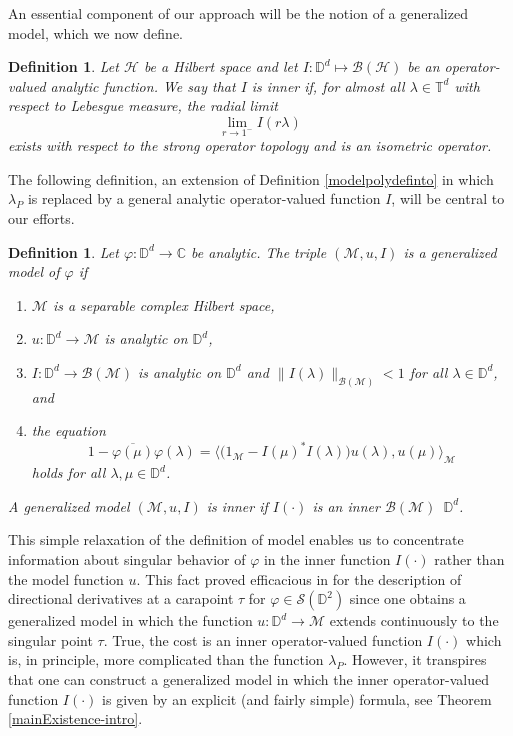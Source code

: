 \documentclass[11pt, reqno]{amsart}
\newtheorem{definition}[theorem]{Definition}
\newcommand\1{\boldsymbol {1}}
\newcommand\m{\mathcal{M}}
\newcommand\lam{\lambda}
\newcommand{\M}{\mathcal{M}}
\newcommand{\D}{\mathbb{D}}
\newcommand{\C}{\mathbb{C}}
\newcommand{\vp}{\varphi}
\newcommand{\ph}{\varphi}
\numberwithin{equation}{section}
\begin{document}
  An essential component of our approach will be the notion of a generalized model, which we now define. 
\begin{definition}\label{inneroperator}
Let $\mathcal{H}$ be a Hilbert space and let 
$I : \mathbb{D}^{d} \mapsto \mathcal{B}(\mathcal{H})$
be an operator-valued analytic function. We say that $I$ is {\em{inner}} if, for almost all $\lambda\in\mathbb{T}^{d}$ with respect to Lebesgue measure, the radial limit 
$$\lim_{r\rightarrow 1^{-}}I(r\lambda)$$ 
exists with respect to the strong operator topology and is an isometric operator. 
\end{definition}
The following definition, an extension of Definition \ref{modelpolydefinto} in which $\lam_P$ is replaced by a general analytic operator-valued function $I$, will be central to our efforts.
\begin{definition}\label{genmodel}
Let $\vp:\D^d\to\C$ be analytic. The triple $(\mathcal M, u, I)$ is a {\em generalized model of $\vp$} if 
\begin{enumerate}
 \item $\M$ is a  separable complex Hilbert space, 
 \item $u: \D^d \to \M$ is analytic on $\mathbb{D}^{d}$, 
 \item $I:\mathbb{D}^{d}\rightarrow\mathcal{B}(\mathcal{M})$ is analytic on $\mathbb{D}^{d}$ and $\|I(\lambda)\|_{\mathcal{B(M)}}<1$ for all $\lambda\in\mathbb{D}^{d}$, and 
\item the equation
\begin{equation}\label{modeleqn-I}
1-\overline{\varphi(\mu)}\varphi(\lambda) = \Big\langle{\big(1_{\mathcal{M}}-I(\mu)^{*}I(\lambda)\big)u(\lambda),u(\mu)} \Big\rangle_{\mathcal{M}}
\end{equation}
holds for all $\lambda, \mu \in \D^d$.
\end{enumerate}
A generalized model $(\mathcal M, u, I)$ is {\em inner} if $I(\cdot)$ is an inner $\mathcal{B(\M)}$~$\mathbb{D}^{d}$.
\end{definition}
 This simple relaxation of the definition of model enables us to concentrate information about singular behavior of $\ph$ in the inner function $I(\cdot)$ rather than the model function $u$.  This fact proved efficacious in \cite{ATY2} for the description of directional derivatives at a carapoint $\tau$ for $\ph \in\mathcal{S}(\D^2)$ since  one obtains a generalized model in which the function $u:\D^d \to \m$ extends continuously to the singular point $\tau$.
True, the cost is an inner operator-valued function $I(\cdot)$ which is, in principle, more complicated than the function $\lambda_P$. However, it transpires that one can construct a generalized model in which the inner operator-valued function $I(\cdot)$ is given by an explicit (and fairly simple) formula, see Theorem \ref{mainExistence-intro}.                 
\end{document}
